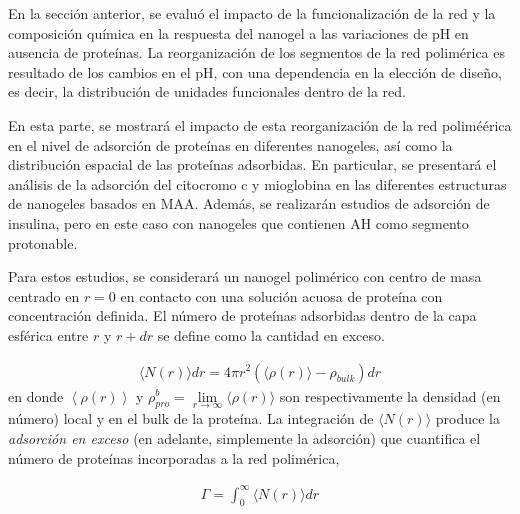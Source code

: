 


En la secci\'on anterior, se evalu\'o el impacto de la funcionalizaci\'on de la red y la composici\'on qu\'imica en la respuesta del nanogel a las variaciones de pH en ausencia de prote\'inas. La reorganizaci\'on de los segmentos de la red polim\'erica es resultado de los cambios en el pH, con una dependencia en la elecci\'on de dise\~no, es decir, la distribuci\'on de unidades funcionales dentro de la red.

En esta parte, se mostrar\'a el impacto de esta reorganizaci\'on de la red polimé\'erica en el nivel de adsorci\'on de prote\'inas en diferentes nanogeles, as\'i como la distribuci\'on espacial de las prote\'inas adsorbidas. En particular, se presentar\'a el an\'alisis de la adsorci\'on del citocromo c y mioglobina en las diferentes estructuras de nanogeles basados en MAA. Adem\'as, se realizar\'an estudios de adsorci\'on de insulina, pero en este caso con nanogeles que contienen AH como segmento protonable.%

Para estos estudios, se considerar\'a un nanogel polim\'erico  con centro de masa centrado en $r=0$ en contacto con una soluci\'on acuosa de prote\'ina con concentraci\'on definida. El n\'umero de prote\'inas adsorbidas dentro de la capa esf\'erica entre $r$ y $r+dr$ se define como la cantidad en exceso. 


\begin{align}
     \langle N(r)\rangle dr = 4\pi r^2 \left(\langle\rho(r)\rangle - \rho_{bulk}\right) dr
\end{align}
%
en donde $\left<\rho(r)\right>$ y $\rho^b_{pro}=\lim\limits_{r\to \infty } \langle\rho(r)\rangle$ son respectivamente la densidad (en n\'umero) local y en el bulk de la prote\'ina.
La integraci\'on de $\langle N(r)\rangle$ produce la \emph{adsorci\'on en exceso} (en adelante, simplemente la adsorci\'on) que cuantifica el n\'umero de prote\'inas incorporadas a la red polim\'erica,


%
\begin{align}
    \Gamma =  \int_0^\infty{  \langle N(r)\rangle dr}
\end{align}
%



